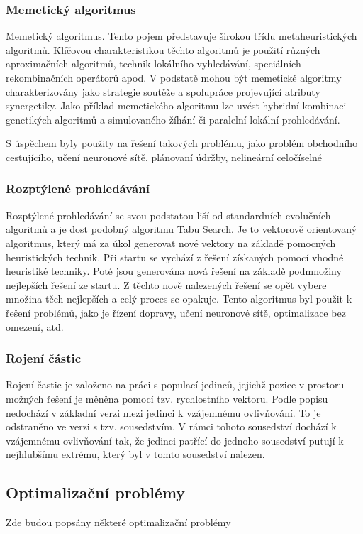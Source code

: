 \documentclass[bc,male,java,dept460]{diploma}		%
\begin{document}
\subsubsection{Memetický algoritmus}
\par Memetický algoritmus. Tento pojem představuje širokou třídu metaheuristických algoritmů. Klíčovou charakteristikou těchto algoritmů je použití různých aproximačních algoritmů, technik lokálního vyhledávání, speciálních rekombinačních operátorů apod. V podstatě mohou být memetické algoritmy charakterizovány jako strategie soutěže a spolupráce projevující atributy synergetiky. Jako příklad memetického algoritmu lze uvést hybridní kombinaci genetikých algoritmů a simulovaného žíhání či paralelní lokální prohledávání. 
\par S úspěchem byly použity na řešení takových problému, jako problém obchodního cestujícího, učení neuronové sítě, plánovaní údržby, nelineární celočíselné

\subsubsection{Rozptýlené prohledávání}
\par Rozptýlené prohledávání se svou podstatou liší od standardních evolučních algoritmů a je dost podobný algoritmu Tabu Search. Je to vektorově orientovaný algoritmus, který má za úkol generovat nové vektory na základě pomocných heuristických technik. Při startu se vychází z řešení získaných pomocí vhodné heuristiké techniky. Poté jsou generována nová řešení na základě podmnožiny nejlepších řešení ze startu. Z těchto nově nalezených řešení se opět vybere množina těch nejlepších a celý proces se opakuje. Tento algoritmus byl použit k řešení problémů, jako je řízení dopravy, učení neuronové sítě, optimalizace bez omezení, atd.

\subsubsection{Rojení částic}
Rojení častic je založeno na práci s populací jedinců, jejichž pozice v prostoru možných řešení je měněna pomocí tzv. rychlostního vektoru. Podle popisu nedochází v základní verzi mezi jedinci k vzájemnému ovlivňování. To je odstraněno ve verzi s tzv. sousedstvím. V rámci tohoto sousedství dochází k vzájemnému ovlivňování tak, že jedinci patřící do jednoho sousedství putují k nejhlubšímu extrému, který byl v tomto sousedství nalezen.

\subsection{Optimalizační problémy}
Zde budou popsány některé optimalizační problémy
\end{document}
